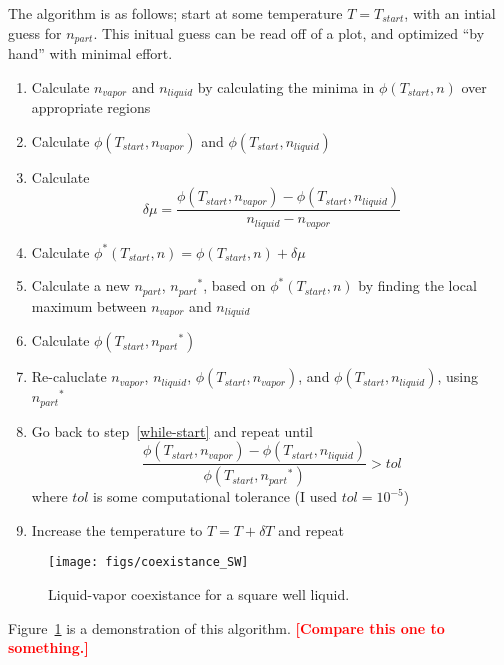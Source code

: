 \documentclass[letterpaper,twocolumn,amsmath,amssymb,prb]{revtex4-1}
\newcommand{\npart}{\ensuremath{n_{part}}}
\newcommand{\nliq}{\ensuremath{n_{liquid}}}
\newcommand{\nvap}{\ensuremath{n_{vapor}}}
\newcommand{\1}{\ensuremath{\textbf{r}_1}}
\newcommand{\2}{\ensuremath{\textbf{r}_2}}
\newcommand{\3}{\ensuremath{\textbf{r}_3}}
\newcommand{\4}{\ensuremath{\textbf{r}_4}}
\newcommand{\fixme}[1]{\textcolor{red}{\textbf{[#1]}}}
\begin{document}
The algorithm is as follows; start at some temperature $T=T_{start}$,
with an intial guess for $\npart$. This initual guess can be read off
of a plot, and optimized ``by hand'' with minimal effort.
\begin{enumerate}
  \item Calculate $\nvap$ and $\nliq$ by calculating the minima in $\phi(T_{start},n)$ over appropriate regions
  \item Calculate $\phi(T_{start},\nvap)$ and $\phi(T_{start},\nliq)$ \label{while-start}
  \item Calculate \[\delta\mu = \frac{\phi(T_{start},\nvap) - \phi(T_{start},\nliq)}{\nliq - \nvap}\]
  \item Calculate $\phi^*(T_{start},n) = \phi(T_{start},n) + \delta\mu$
  \item Calculate a new $\npart$, $\npart^*$, based on $\phi^*(T_{start},n)$ by finding the local maximum between $\nvap$ and $\nliq$
  \item Calculate $\phi(T_{start},\npart^*)$
  \item Re-caluclate $\nvap$, $\nliq$, $\phi(T_{start},\nvap)$, and $\phi(T_{start},\nliq)$, using $\npart^*$
  \item Go back to step~\ref{while-start} and repeat until \[ \frac{\phi(T_{start},\nvap) - \phi(T_{start},\nliq)}{\phi(T_{start},\npart^*)} > tol  \] where $tol$ is some computational tolerance (I used $tol=10^{-5}$)
  \item Increase the temperature to $T = T + \delta T$ and repeat
\end{enumerate}

\begin{figure}
  \begin{center}
  \texttt{[image: figs/coexistance\_SW]}
  \end{center}
  \caption{Liquid-vapor coexistance for a square well liquid.}
  \label{fig:coexistance_SW}
\end{figure}

Figure~\ref{fig:coexistance_SW} is a demonstration of this algorithm. \fixme{Compare this one to something.}
\end{document}
